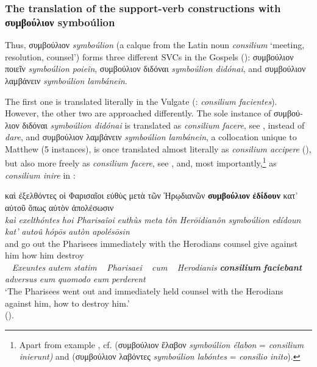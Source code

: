 \documentclass[output=paper,colorlinks,citecolor=brown]{langscibook}
\begin{document}
\subsubsection{The translation of the support-verb constructions with συμβούλιον symboúlion}\label{sec:bj:4:2:1}

Thus, συμβούλιον \emph{symboúlion} (a calque from the Latin noun \emph{consilium}
`meeting, resolution, counsel') forms three different SVCs in the Gospels
(\cite{JiménezLópez2017}): συμβούλιον ποιεῖν \emph{symboúlion poieîn}, συμβούλιον
διδόναι \emph{symboúlion didónai}, and συμβούλιον λαμβάνειν \emph{symboúlion
  lambánein}.

The first one is translated literally in the Vulgate (: \emph{consilium
  facientes}). However, the other two are approached differently. The sole instance of
\foreignlanguage{greek}{συμβούλιον} διδόναι \emph{symboúlion didónai} is
translated as \emph{consilium facere}, see , instead of \emph{dare}, and
συμβούλιον λαμβάνειν \emph{symboúlion lambánein}, a collocation unique to Matthew (5
instances), is once translated almost literally as \emph{consilium accipere} (),
but also more freely as \emph{consilium facere}, see , and, most
importantly,\footnote{Apart from example , cf.  (συμβούλιον ἔλαβον
  \emph{symboúlion élabon} = \emph{consilium inierunt)} and  (συμβούλιον λαβόντες
  \emph{symboúlion labóntes} = \emph{consilio inito}).} as \emph{consilium inire} in
:



\ea\label{ex:bj:18}

\gllll καὶ ἐξελθόντες οἱ Φαρισαῖοι εὐθὺς μετὰ τῶν Ἡρῳδιανῶν \textbf{συμβούλιον} \textbf{ἐδίδουν} κατ' αὐτοῦ ὅπως αὐτὸν ἀπολέσωσιν\\
 \textit{kaì} \textit{exelthóntes} \textit{hoi} \textit{Pharisaîoi} \textit{euthùs} \textit{meta} \textit{tôn} \textit{Herōidianôn} \textit{symboúlion} \textit{edídoun} \textit{kat'} \textit{autoû} \textit{hópōs} \textit{autòn} \textit{apolésōsin}\\
and {go out} the Pharisees immediately with the Herodians counsel give against him how him destroy\\
~ {\emph{Exeuntes} \emph{autem} \emph{statim}} ~ \emph{Pharisaei} ~ \emph{cum} ~ \emph{Herodianis}
\textbf{\itshape consilium} \textbf{\itshape faciebant} \emph{adversus} \emph{eum} \emph{quomodo} \emph{eum} \emph{perderent}\\
\glt `The Pharisees went out and immediately held counsel with the Herodians against him, how to destroy him.' \\
\hspace*{\fill}().
\end{document}
